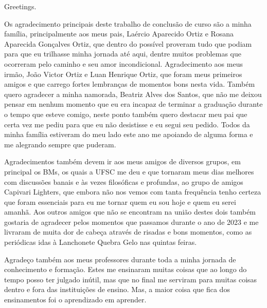 


\begin{agradecimentos}

\lang
{
    Greetings.
}
{
    Os agradecimento principais deste trabalho de conclusão de curso são a minha
    família, principalmente aos meus pais, Laércio Aparecido Ortiz e Rosana
    Aparecida Gonçalves Ortiz, que dentro do possível proveram tudo que podiam
    para que eu trilhasse minha jornada até aqui, dentre muitos problemas que
    ocorreram pelo caminho e seu amor incondicional. Agradecimento aos meus irmão,
    João Victor Ortiz e Luan Henrique Ortiz, que foram meus primeiros amigos e
    que carrego fortes lembranças de momentos bons nesta vida. Também quero agradecer
    a minha namorada, Beatriz Alves dos Santos, que não me deixou pensar em nenhum
    momento que eu era incapaz de terminar a graduação durante o tempo que esteve
    comigo, neste ponto também quero destacar meu pai que certa vez me pediu para que
    eu não desistisse e eu segui seu pedido. Todos da minha família estiveram do meu lado
    este ano me apoiando de alguma forma e me alegrando sempre que puderam.

	Agradecimentos também devem ir aos meus amigos de diversos grupos, em principal os BMs,
    os quais a UFSC me deu e que tornaram meus dias melhores com discussões banais e às
    vezes filosóficas e profundas, ao grupo de amigos Capivari Lighters, que embora não
    nos vemos com tanta frequência tenho certeza que foram essenciais para eu me tornar
    quem eu sou hoje e quem eu serei amanhã. Aos outros amigos que não se encontram na
    união destes dois também gostaria de agradecer pelos momentos que passamos durante o
    ano de 2023 e me livraram de muita dor de cabeça através de risadas e bons momentos,
    como as periódicas idas à Lanchonete Quebra Gelo nas quintas feiras.
	
	Agradeço também aos meus professores durante toda a minha jornada de conhecimento 
	e formação. Estes me ensinaram muitas coisas que ao longo do tempo posso ter julgado
	inútil, mas que no final me serviram para muitas coisas dentro e fora das instituições
	de ensino. Mas, a maior coisa que fica dos ensinamentos foi o aprendizado em aprender.
}
\end{agradecimentos}
